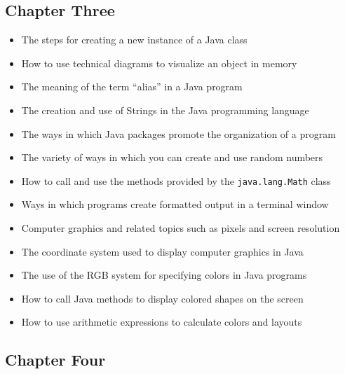 \documentclass[11pt]{article}
\begin{document}
\subsection*{Chapter Three}

\begin{itemize}

  \itemsep 0in

  \item The steps for creating a new instance of a Java class
  \item How to use technical diagrams to visualize an object in memory
  \item The meaning of the term ``alias'' in a Java program
  \item The creation and use of Strings in the Java programming language
  \item The ways in which Java packages promote the organization of a program
  \item The variety of ways in which you can create and use random numbers
  \item How to call and use the methods provided by the {\tt java.lang.Math} class
  \item Ways in which programs create formatted output in a terminal window
  \item Computer graphics and related topics such as pixels and screen resolution
  \item The coordinate system used to display computer graphics in Java
  \item The use of the RGB system for specifying colors in Java programs
  \item How to call Java methods to display colored shapes on the screen
  \item How to use arithmetic expressions to calculate colors and layouts

\end{itemize}

\subsection*{Chapter Four}
\end{document}
